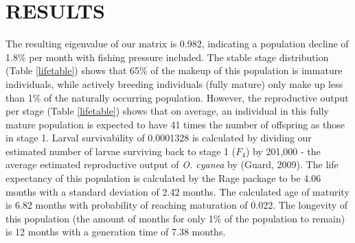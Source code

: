 \documentclass[
]{article}
\begin{document}
\begin{table}
\centering
\caption{\label{tab:LifeHistory}Existing research and information on the per-stage duration of \emph{O. cyanea}. All existing estimates are from Heukelem (1973), Heukelem (1976), Guard \& Mgaya (2003), Humber et al. (2006), Aina (2009). Note: Heukelem (1976) estimate the time to maturity to be 10-13 months (i.e.~stages 1-3 combined). Equations used to estimate metrics from this Lefkovitch Matrix are outlined in Barot et al. (2002). \label{LifeHistory}}
\centering
{}
\end{table}



\hypertarget{results}{%
\section{RESULTS}\label{results}}

The resulting eigenvalue of our matrix is 0.982, indicating a population decline of 1.8\% per month with fishing pressure included. The stable stage distribution (Table \ref{lifetable}) shows that 65\% of the makeup of this population is immature individuals, while actively breeding individuals (fully mature) only make up less than 1\% of the naturally occurring population. However, the reproductive output per stage (Table \ref{lifetable}) shows that on average, an individual in this fully mature population is expected to have 41 times the number of offspring as those in stage 1. Larval survivability of 0.0001328 is calculated by dividing our estimated number of larvae surviving back to stage 1 (\(F_4\)) by 201,000 - the average estimated reproductive output of \emph{O. cyanea} by (Guard, 2009). The life expectancy of this population is calculated by the Rage package to be 4.06 months with a standard deviation of 2.42 months. The calculated age of maturity is 6.82 months with probability of reaching maturation of 0.022. The longevity of this population (the amount of months for only 1\% of the population to remain) is 12 months with a generation time of 7.38 months.
\end{document}
